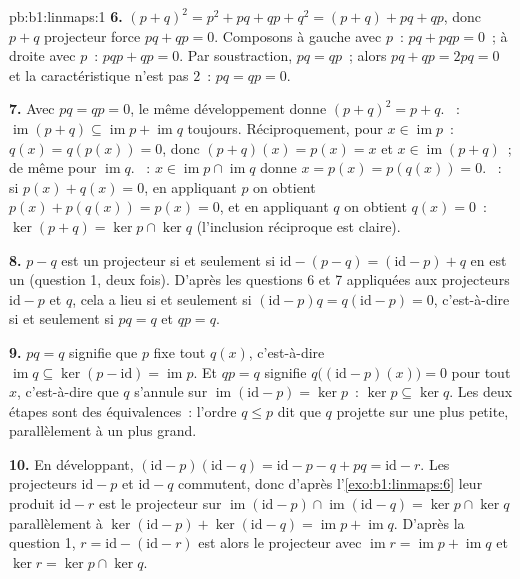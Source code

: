 \begin{solution}{pb:b1:linmaps:1}
\textbf{6.} $(p + q)^2 = p^2 + pq + qp + q^2 = (p + q) + pq +
qp$, donc $p + q$ projecteur force $pq + qp = 0$. Composons à
gauche avec $p$~: $pq + pqp = 0$~; à droite avec $p$~: $pqp + qp
= 0$. Par soustraction, $pq = qp$~; alors $pq + qp = 2pq = 0$ et la
caractéristique n'est pas $2$~: $pq = qp = 0$.

\textbf{7.} Avec $pq = qp = 0$, le même développement donne $(p +
q)^2 = p + q$. ~: $\operatorname{im}(p + q) \subseteq
\operatorname{im} p + \operatorname{im} q$ toujours. Réciproquement,
pour $x \in \operatorname{im} p$~: $q(x) = q(p(x)) = 0$, donc $(p +
q)(x) = p(x) = x$ et $x \in \operatorname{im}(p+q)$~; de même pour
$\operatorname{im} q$. ~: $x \in \operatorname{im} p
\cap \operatorname{im} q$ donne $x = p(x) = p(q(x)) = 0$.
~: si $p(x) + q(x) = 0$, en appliquant $p$ on obtient $p(x) +
p(q(x)) = p(x) = 0$, et en appliquant $q$ on obtient $q(x) = 0$~: $\ker(p
+ q) = \ker p \cap \ker q$ (l'inclusion réciproque est claire).

\textbf{8.} $p - q$ est un projecteur si et seulement si $\mathrm{id} - (p - q) =
(\mathrm{id} - p) + q$ en est un (question 1, deux fois). D'après les questions
6 et 7 appliquées aux projecteurs $\mathrm{id} - p$ et $q$, cela
a lieu si et seulement si $(\mathrm{id} - p)q = q(\mathrm{id} - p) = 0$, c'est-à-dire
si et seulement si $pq = q$ et $qp = q$.

\textbf{9.} $pq = q$ signifie que $p$ fixe tout $q(x)$, c'est-à-dire
$\operatorname{im} q \subseteq \ker(p - \mathrm{id}) =
\operatorname{im} p$. Et $qp = q$ signifie $q\bigl((\mathrm{id} -
p)(x)\bigr) = 0$ pour tout $x$, c'est-à-dire que $q$ s'annule sur
$\operatorname{im}(\mathrm{id} - p) = \ker p$~: $\ker p \subseteq
\ker q$. Les deux étapes sont des équivalences~: l'ordre $q \leq p$ dit que
$q$ projette sur une  plus petite, parallèlement à un  plus grand.

\textbf{10.} En développant, $(\mathrm{id} - p)(\mathrm{id} - q) =
\mathrm{id} - p - q + pq = \mathrm{id} - r$. Les projecteurs
$\mathrm{id} - p$ et $\mathrm{id} - q$ commutent, donc d'après
l'\cref{exo:b1:linmaps:6} leur produit $\mathrm{id} - r$ est le
projecteur sur $\operatorname{im}(\mathrm{id} - p) \cap
\operatorname{im}(\mathrm{id} - q) = \ker p \cap \ker q$ parallèlement à
$\ker(\mathrm{id} - p) + \ker(\mathrm{id} - q) =
\operatorname{im} p + \operatorname{im} q$. D'après la question 1, $r =
\mathrm{id} - (\mathrm{id} - r)$ est alors le projecteur avec
$\operatorname{im} r = \operatorname{im} p + \operatorname{im}
q$ et $\ker r = \ker p \cap \ker q$.


\end{solution}
